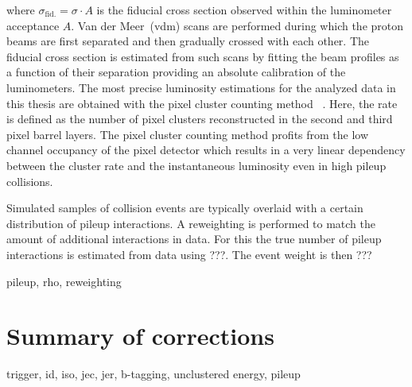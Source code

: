 where $\sigma_\mathrm{fid.}=\sigma\cdot A$ is the fiducial cross section observed within the luminometer acceptance $A$. Van der Meer~(\gls{vdm}) scans are performed during which the proton beams are first separated and then gradually crossed with each other. The fiducial cross section is estimated from such scans by fitting the beam profiles as a function of their separation providing an absolute calibration of the luminometers. The most precise luminosity estimations for the analyzed data in this thesis are obtained with the pixel cluster counting method~\cite{CMS-PAS-LUM-13-001} . Here, the rate is defined as the number of pixel clusters reconstructed in the second and third pixel barrel layers. The pixel cluster counting method profits from the low channel occupancy of the pixel detector which results in a very linear dependency between the cluster rate and the instantaneous luminosity even in high pileup collisions.

Simulated samples of collision events are typically overlaid with a certain distribution of pileup interactions. A reweighting is performed to match the amount of additional interactions in data. For this the true number of pileup interactions is estimated from data using ???. The event weight is then ???

pileup, rho, reweighting



\section{Summary of corrections}

trigger, id, iso, jec, jer, b-tagging, unclustered energy, pileup

